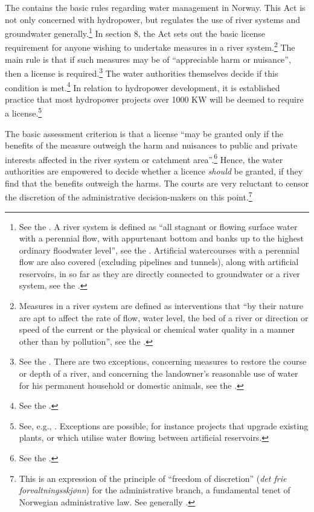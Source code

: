 The \cite{wra00} contains the basic rules regarding water management in Norway. This Act is not only concerned with hydropower, but regulates the use of river systems and groundwater generally.\footnote{See the \dni\cite[1]{wra00}. A river system is defined as ``all stagnant or flowing surface water with a perennial flow, with appurtenant bottom and banks up to the highest ordinary floodwater level'', see the \dni\cite[2]{wra00}. Artificial watercourses with a perennial flow are also covered (excluding pipelines and tunnels), along with artificial reservoirs, in so far as they are directly connected to groundwater or a river system, see the \dni\cite[2a, 2b]{wra00}.} In section 8, the Act sets out the basic license requirement for anyone wishing to undertake measures in a river system.\footnote{Measures in a river system are defined as interventions that ``by their nature are apt to affect the rate of flow, water level, the bed of a river or direction or speed of the current or the physical or chemical water quality in a manner other than by pollution'', see the \dni\cite[3a]{wra00}.} The main rule is that if such measures may be of ``appreciable harm or nuisance'', then a license is required.\footnote{See the \dni\cite[8]{wra00}. There are two exceptions, concerning measures to restore the course or depth of a river, and concerning the landowner's reasonable use of water for his permanent household or domestic animals, see the \dni\cite[12|15]{wra00}.} The water authorities themselves decide if this condition is met.\footnote{See the \dni\cite[18]{wra00}.} In relation to hydropower development, it is established practice that most hydropower projects over 1000 KW will be deemed to require a license.\footnote{See, e.g., \cite{nve09}. Exceptions are possible, for instance projects that upgrade existing plants, or which utilise water flowing between artificial reservoirs.}

The basic assessment criterion is that a license ``may be granted only if the benefits of the measure outweigh the harm and nuisances to public and private interests affected in the river system or catchment area''.\footnote{See the \dni\cite[25]{wra00}.} Hence, the water authorities are empowered to decide whether a licence {\it should} be granted, if they find that the benefits outweigh the harms. The courts are very reluctant to censor the discretion of the administrative decision-makers on this point.\footnote{This is an expression of the principle of ``freedom of discretion'' ({\it det frie forvaltningsskjønn}) for the administrative branch, a fundamental tenet of Norwegian administrative law. See generally \cite[71-74]{eckhoff14}.}

